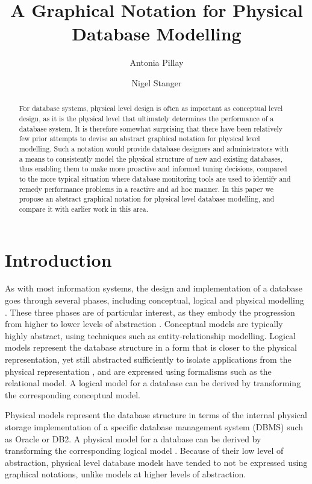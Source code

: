 \documentclass{CRPITStyle}
\title{A Graphical Notation for Physical Database Modelling}
\author{Antonia Pillay \and Nigel Stanger}
\affiliation{Department of Information Science, \\
	University of Otago, \\
	PO Box 56, Dunedin, New Zealand \\
	Email:~\texttt{nstanger@infoscience.otago.ac.nz}}
\begin{document}
\maketitle


\begin{abstract}
For database systems, physical level design is often as important as
conceptual level design, as it is the physical level that ultimately
determines the performance of a database system. It is therefore
somewhat surprising that there have been relatively few prior attempts
to devise an abstract graphical notation for physical level modelling.
Such a notation would provide database designers and administrators with
a means to consistently model the physical structure of new and existing
databases, thus enabling them to make more proactive and informed tuning
decisions, compared to the more typical situation where database
monitoring tools are used to identify and remedy performance problems in
a reactive and ad hoc manner. In this paper we propose an abstract
graphical notation for physical level database modelling, and compare it
with earlier work in this area.
\end{abstract}


\section{Introduction}

As with most information systems, the design and implementation of a
database goes through several phases, including conceptual, logical and
physical modelling \cite{BeDa-P-2003}. These three phases are of
particular interest, as they embody the progression from higher to lower
levels of abstraction \cite{Tsic-D-1978}. Conceptual models are
typically highly abstract, using techniques such as entity-relationship
modelling. Logical models represent the database structure in a form
that is closer to the physical representation, yet still abstracted
sufficiently to isolate applications from the physical representation
\cite{Codd-EF-1970}, and are expressed using formalisms such as the
relational model. A logical model for a database can be derived by
transforming the corresponding conceptual model.

Physical models represent the database structure in terms of the
internal physical storage implementation of a specific database
management system (DBMS) such as Oracle or DB2. A physical model for a
database can be derived by transforming the corresponding logical model
\cite{Bato-DS-1985,Conn-TM-2002}. Because of their low level of
abstraction, physical level database models have tended to not be
expressed using graphical notations, unlike models at higher levels of
abstraction.
\end{document}
